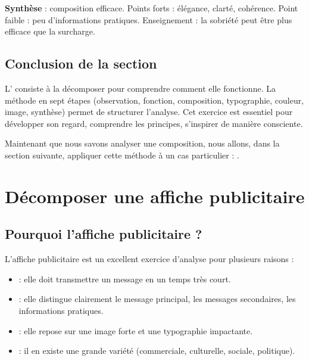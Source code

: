 \textbf{Synthèse} : composition efficace. Points forts : élégance, clarté, cohérence. Point faible : peu d'informations pratiques. Enseignement : la sobriété peut être plus efficace que la surcharge.

\subsection*{Conclusion de la section}

\begin{retenir}
L' consiste à la décomposer pour comprendre comment elle fonctionne. La méthode en sept étapes (observation, fonction, composition, typographie, couleur, image, synthèse) permet de structurer l'analyse. Cet exercice est essentiel pour développer son regard, comprendre les principes, s'inspirer de manière consciente.
\end{retenir}

Maintenant que nous savons analyser une composition, nous allons, dans la section suivante, appliquer cette méthode à un cas particulier : .

\section{Décomposer une affiche publicitaire}

\subsection{Pourquoi l'affiche publicitaire ?}

L'affiche publicitaire est un excellent exercice d'analyse pour plusieurs raisons :

\begin{itemize}
    \item {} : elle doit transmettre un message en un temps très court.
    \item {} : elle distingue clairement le message principal, les messages secondaires, les informations pratiques.
    \item {} : elle repose sur une image forte et une typographie impactante.
    \item {} : il en existe une grande variété (commerciale, culturelle, sociale, politique).
\end{itemize}

